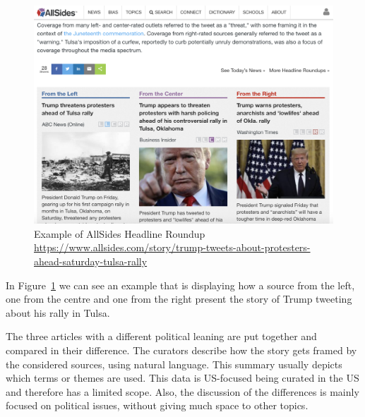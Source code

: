 \begin{figure}[!htb]
    \centering
    \includegraphics[width=\linewidth]{figures/allsides.png}
    \caption{Example of AllSides Headline Roundup \url{https://www.allsides.com/story/trump-tweets-about-protesters-ahead-saturday-tulsa-rally}}
    \label{fig:allsides}
\end{figure}

In Figure~\ref{fig:allsides} we can see an example that is displaying how a source from the left, one from the centre and one from the right present the story of Trump tweeting about his rally in Tulsa.



The three articles with a different political leaning are put together and compared in their difference.
The curators describe how the story gets framed by the considered sources, using natural language.
This summary usually depicts which terms or themes are used. %
This data is US-focused being curated in the US and therefore has a limited scope. Also, the discussion of the differences is mainly focused on political issues, without giving much space to other topics.


